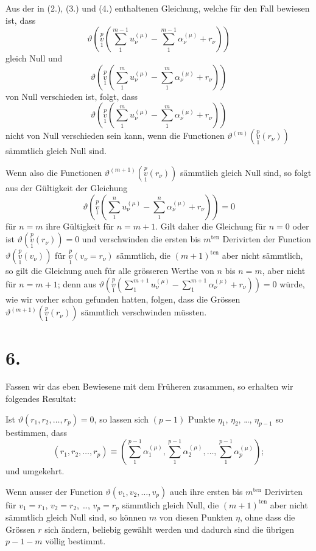 \documentclass{article}
\begin{document}
Aus der in (2.), (3.) und (4.) enthaltenen Gleichung, welche für den Fall bewiesen ist, dass
\[
\vartheta\left(\overset{p}{\underset{1}{v}}\left(\sum_1^{m-1} u_\nu^{(\mu)} - \sum_1^{m-1} \alpha_\nu^{(\mu)} + r_\nu\right)\right)
\]
gleich Null und
\[
\vartheta\left(\overset{p}{\underset{1}{v}}\left(\sum_1^m u_\nu^{(\mu)} - \sum_1^m \alpha_\nu^{(\mu)} + r_\nu\right)\right)
\]
von Null verschieden ist, folgt, dass
\[
\vartheta\left(\overset{p}{\underset{1}{v}}\left(\sum_1^m u_\nu^{(\mu)} - \sum_1^m \alpha_\nu^{(\mu)} + r_\nu\right)\right)
\]
nicht von Null verschieden sein kann, wenn die Functionen $\vartheta^{(m)}\left(\overset{p}{\underset{1}{v}}(r_\nu)\right)$ sämmtlich gleich Null sind.

Wenn also die Functionen $\vartheta^{(m+1)}\left(\overset{p}{\underset{1}{v}}(r_\nu)\right)$ sämmtlich gleich Null sind, so folgt aus der Gültigkeit der Gleichung
\[
\vartheta\left(\overset{p}{\underset{1}{v}}\left(\sum_1^n u_\nu^{(\mu)} - \sum_1^n \alpha_\nu^{(\mu)} + r_\nu\right)\right) = 0
\]
für $n=m$ ihre Gültigkeit für $n=m+1$. Gilt daher die Gleichung für $n=0$ oder ist $\vartheta\left(\overset{p}{\underset{1}{v}}(r_\nu)\right) = 0$ und verschwinden die ersten bis $m^{\text{ten}}$ Derivirten der Function $\vartheta\left(\overset{p}{\underset{1}{v}}(v_\nu)\right)$ für $\overset{p}{\underset{1}{v}}(v_\nu = r_\nu)$ sämmtlich, die $(m+1)^{\text{ten}}$ aber nicht sämmtlich,
so gilt die Gleichung auch für alle grösseren Werthe von $n$ bis $n=m$, aber nicht für $n=m+1$; denn aus $\displaystyle\vartheta\left(\overset{p}{\underset{1}{v}}\left(\sum_1^{m+1} u_\nu^{(\mu)} - \sum_1^{m+1} \alpha_\nu^{(\mu)} + r_\nu\right)\right) = 0$ würde, wie wir vorher schon gefunden hatten, folgen, dass die Grössen $\vartheta^{(m+1)}\left(\overset{p}{\underset{1}{v}}(r_\nu)\right)$ sämmtlich verschwinden müssten.

\section*{6.}

Fassen wir das eben Bewiesene mit dem Früheren zusammen, so erhalten wir folgendes Resultat:

Ist $\vartheta(r_1, r_2, \dots, r_p) = 0$, so lassen sich $(p-1)$ Punkte $\eta_1$, $\eta_2$, \dots, $\eta_{p-1}$ so bestimmen, dass
\[
(r_1, r_2, \dots, r_p) \equiv \left(\sum_1^{p-1} \alpha_1^{(\mu)}, \sum_1^{p-1} \alpha_2^{(\mu)}, \dots, \sum_1^{p-1} \alpha_p^{(\mu)}\right);
\]
und umgekehrt.

Wenn ausser der Function $\vartheta(v_1, v_2, \dots, v_p)$ auch ihre ersten bis $m^{\text{ten}}$ Derivirten für $v_1 = r_1$, $v_2 = r_2$, \dots, $v_p = r_p$ sämmtlich gleich Null, die $(m+1)^{\text{ten}}$ aber nicht sämmtlich gleich Null sind, so können $m$ von diesen Punkten $\eta$, ohne dass die Grössen $r$ sich ändern, beliebig gewählt werden und dadurch sind die übrigen $p-1-m$ völlig bestimmt.
\end{document}
